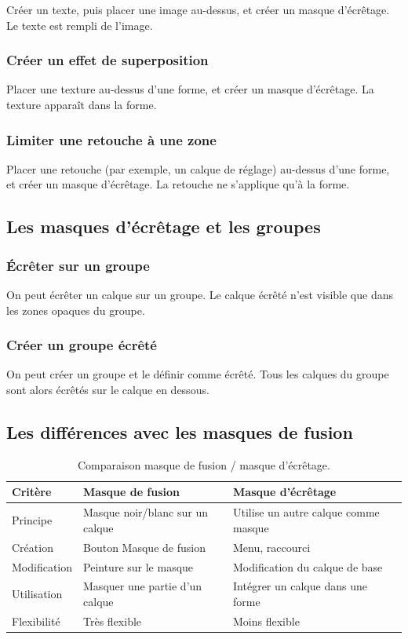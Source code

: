 Créer un texte, puis placer une image au-dessus, et créer un masque d'écrêtage. Le texte est rempli de l'image.

\subsubsection{Créer un effet de superposition}

Placer une texture au-dessus d'une forme, et créer un masque d'écrêtage. La texture apparaît dans la forme.

\subsubsection{Limiter une retouche à une zone}

Placer une retouche (par exemple, un calque de réglage) au-dessus d'une forme, et créer un masque d'écrêtage. La retouche ne s'applique qu'à la forme.

\subsection{Les masques d'écrêtage et les groupes}

\subsubsection{Écrêter sur un groupe}

On peut écrêter un calque sur un groupe. Le calque écrêté n'est visible que dans les zones opaques du groupe.

\subsubsection{Créer un groupe écrêté}

On peut créer un groupe et le définir comme écrêté. Tous les calques du groupe sont alors écrêtés sur le calque en dessous.

\subsection{Les différences avec les masques de fusion}

\begin{table}[h!]
\centering
\begin{tabular}{@{}p{4cm}p{5cm}p{5cm}@{}}
\toprule
\textbf{Critère} & \textbf{Masque de fusion} & \textbf{Masque d'écrêtage} \\
\midrule
Principe & Masque noir/blanc sur un calque & Utilise un autre calque comme masque \\
Création & Bouton Masque de fusion & Menu, raccourci \\
Modification & Peinture sur le masque & Modification du calque de base \\
Utilisation & Masquer une partie d'un calque & Intégrer un calque dans une forme \\
Flexibilité & Très flexible & Moins flexible \\
\bottomrule
\end{tabular}
\caption{Comparaison masque de fusion / masque d'écrêtage.}
\end{table}

